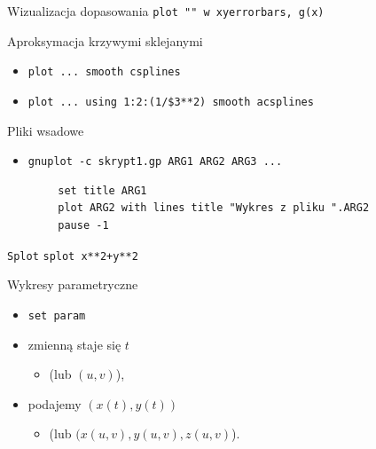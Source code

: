 \documentclass{beamer}
\begin{document}

\begin{frame}[containsverbatim]{Wizualizacja dopasowania}
    \verb|plot "" w xyerrorbars, g(x)|
\end{frame}

\begin{frame}[containsverbatim]{Aproksymacja krzywymi sklejanymi}
        \begin{itemize}
        \item \verb|plot ... smooth csplines|
        \item \verb|plot ... using 1:2:(1/$3**2) smooth acsplines|
    \end{itemize}
\end{frame}
\begin{frame}[containsverbatim]{Pliki wsadowe}
    \begin{itemize}
        \item \verb|gnuplot -c skrypt1.gp ARG1 ARG2 ARG3 ...|
    \end{itemize}
    \begin{verbatim}
        set title ARG1
        plot ARG2 with lines title "Wykres z pliku ".ARG2
        pause -1
    \end{verbatim}
\end{frame}
\begin{frame}[containsverbatim]{\texttt{Splot}}
\texttt{splot x**2+y**2}
\end{frame}
\begin{frame}{Wykresy parametryczne}
    \begin{itemize}
        \item \texttt{set param}
        \item zmienną staje się $t$ 
        \begin{itemize}
            \item (lub $(u,v)$),
        \end{itemize}
        \item podajemy $(x(t), y(t))$
        \begin{itemize}
            \item (lub $(x(u,v), y(u,v), z(u,v)$).
        \end{itemize}
    \end{itemize}
\end{frame}
\end{document}
